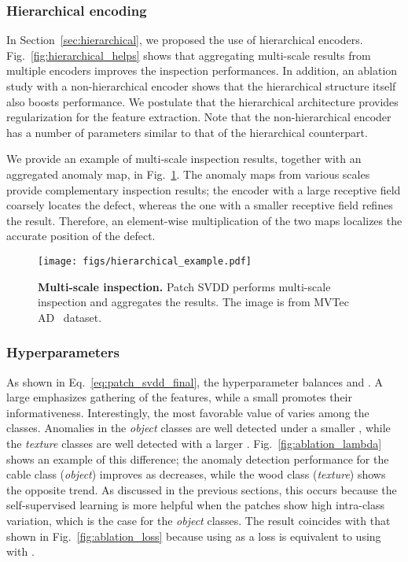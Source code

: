 \documentclass[runningheads]{llncs}
\begin{document}
\subsubsection{Hierarchical encoding} \label{sec:hierarchical_results}
In Section~\ref{sec:hierarchical}, we proposed the use of hierarchical encoders.
Fig.~\ref{fig:hierarchical_helps} shows that aggregating multi-scale results from multiple encoders improves the inspection performances.
In addition, an ablation study with a non-hierarchical encoder shows that the hierarchical structure itself also boosts performance.
We postulate that the hierarchical architecture provides regularization for the feature extraction.
Note that the non-hierarchical encoder has a number of parameters similar to that of the hierarchical counterpart.

We provide an example of multi-scale inspection results, together with an aggregated anomaly map, in Fig.~\ref{fig:hierarchical_maps}.
The anomaly maps from various scales provide complementary inspection results; the encoder with a large receptive field coarsely locates the defect, whereas the one with a smaller receptive field refines the result.
Therefore, an element-wise multiplication of the two maps localizes the accurate position of the defect.

\begin{figure}[t]
    \centering
    \texttt{[image: figs/hierarchical\_example.pdf]}
    \vspace{-10pt}
    \caption{\textbf{Multi-scale inspection.} Patch SVDD performs multi-scale inspection and aggregates the results. The image is from MVTec AD~\cite{mvtecad} dataset.
    }
    \label{fig:hierarchical_maps}
    \vspace{-5pt}
\end{figure}
 

\subsubsection{Hyperparameters}
As shown in Eq.~\ref{eq:patch_svdd_final}, the hyperparameter  balances  and .
A large  emphasizes gathering of the features, while a small  promotes their informativeness.
Interestingly, the most favorable value of  varies among the classes.
Anomalies in the \textit{object} classes are well detected under a smaller , while the \textit{texture} classes are well detected with a larger .
Fig.~\ref{fig:ablation_lambda} shows an example of this difference; the anomaly detection performance for the cable class (\textit{object}) improves as  decreases, while the wood class (\textit{texture}) shows the opposite trend.
As discussed in the previous sections, this occurs because the self-supervised learning is more helpful when the patches show high intra-class variation, which is the case for the \textit{object} classes.
The result coincides with that shown in Fig.~\ref{fig:ablation_loss} because using  as a loss is equivalent to using  with .
\end{document}
